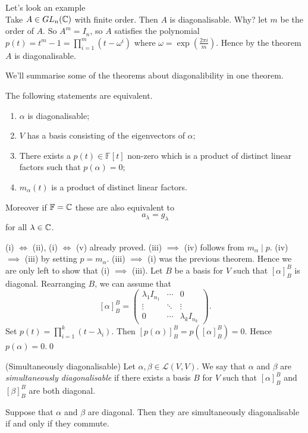 \documentclass{article}
\newcommand{\F}{\mathbb{F}}
\begin{document}
Let's look an example\\
Take $ A\in GL_n(\mathbb{C}) $ with finite order. Then $ A $ is diagonalisable. Why? let $ m $ be the order of $ A $. So $ A^m=I_n $, so $ A $ satisfies the polynomial $ p(t)=t^m-1=\prod_{i=1}^m(t-\omega^i) $ where $ \omega=\exp\left(\frac {2\pi i }m\right) $. Hence by the theorem $ A $ is diagonalisable.
\par
We'll summarise some of the theorems about diagonalibility in one theorem.
\begin{theorem}
  The following statements are equivalent.
  \begin{enumerate}
	  \item $ \alpha $ is diagonalisable;
	  \item $ V $ has a basis consisting of the eigenvectors of $ \alpha $;
	  \item There exists a $ p(t)\in\F[t] $ non-zero which is a product of distinct linear factors such that $ p(\alpha)=0 $;
	  \item $ m_\alpha(t) $ is a product of distinct linear factors.
  \end{enumerate}
  Moreover if $ \F=\C $ these are also equivalent to
  \[
    a_\lambda=g_\lambda
  \]
  for all $ \lambda\in \mathbb{C} $.
\end{theorem}
\pf (i) $ \iff $ (ii), (i) $ \iff $ (v) already proved. (iii) $ \implies $ (iv)	follows from $ m_\alpha\mid p $. (iv) $ \implies $ (iii) by setting $ p=m_\alpha $. (iii) $ \implies $ (i) was the previous theorem. Hence we are only left to show that (i) $ \implies $ (iii). Let $ B $ be a basis for $ V $ such that $ [\alpha]_B^B $ is diagonal. Rearranging $ B $, we can assume that
\[
	[\alpha]^B_B=\begin{pmatrix}
		\lambda_1I_{n_1} & \cdots & 0 \\
		\vdots & \ddots & \vdots\\
		0 & \cdots & \lambda_kI_{n_k}
	\end{pmatrix}.
\]
Set $ p(t)=\prod_{i=1}^k(t-\lambda_i) $. Then $ [p(\alpha)]^B_B=p([\alpha]^B_B)=0 $. Hence $ p(\alpha)=0 $.\qed
\begin{definition}
	(Simultaneously diagonalisable) Let $ \alpha,\beta\in\mathcal L(V,V) $. We say that $ \alpha $ and $ \beta $ are \textit{simultaneously diagonalisable} if there exists a basis $ B $ for $ V $ such that $ [\alpha]^B_B $ and $ [\beta]^B_B $ are both diagonal.
\end{definition}
\begin{theorem}
  Suppose that $ \alpha $ and $ \beta $ are diagonal. Then they are simultaneously diagonalisable if and only if they commute.
\end{theorem}
\end{document}
